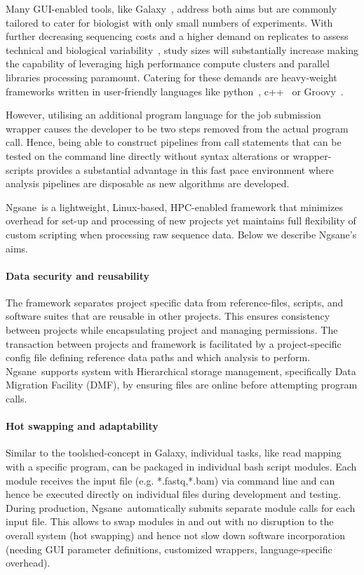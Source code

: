 \documentclass{bioinfo}
\newcommand{\prog}{{\sc Ngsane}}
\begin{document}
Many GUI-enabled tools, like Galaxy~\cite{Goecks2010}, address both aims but are commonly tailored to cater for biologist with only small numbers of experiments. 
With further decreasing sequencing costs and a higher demand on replicates to assess technical and biological variability~\cite{Auer2010}, study sizes will substantially increase making the capability of leveraging high performance compute clusters and parallel libraries processing paramount. 
Catering for these demands are heavy-weight frameworks written in user-friendly languages like python~\cite{Koester2012, McCoy2013, Brouwer2012}, c++~\cite{Tsirigos2012} or Groovy~\cite{Sadedin2012}. 

However, utilising an additional program language for the job submission wrapper causes the developer to be two steps removed from the actual program call. 
Hence, being able to construct pipelines from call statements that can be tested on the command line directly without syntax alterations or wrapper-scripts provides a substantial advantage in this fast pace environment where analysis pipelines are disposable as new algorithms are developed.    
 
\prog\ is a lightweight, Linux-based, HPC-enabled framework that minimizes overhead for set-up and processing of new projects yet maintains full flexibility of custom scripting when processing raw sequence data.
Below we describe \prog's aims.

\paragraph{Data security and reusability}
The framework separates project specific data from reference-files, scripts, and software suites that are reusable in other projects. 
This ensures consistency between projects while encapsulating project and managing permissions. 
The transaction between projects and framework is facilitated by a project-specific config file defining reference data paths and which analysis to perform. 
\prog\ supports system with Hierarchical storage management, specifically Data Migration Facility (DMF), by ensuring files are online before attempting program calls. 

\paragraph{Hot swapping and adaptability}
Similar to the toolshed-concept in Galaxy, individual tasks, like read mapping with a specific program, can be packaged in individual bash script modules.
Each module receives the input file (e.g. *.fastq,*.bam) via command line and can hence be executed directly on individual files during development and testing.
During production, \prog\ automatically submits separate module calls for each input file. 
This allows to swap modules in and out with no disruption to the overall system (hot swapping) and hence not slow down software incorporation (needing GUI parameter definitions, customized wrappers, language-specific overhead).
\end{document}

